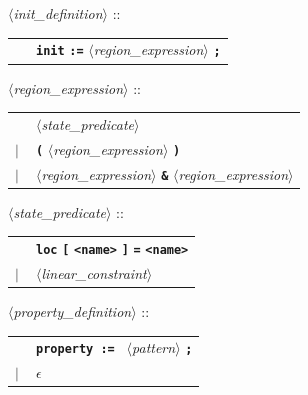 \documentclass[a4paper,11pt]{article}
\newcommand{\emptystring}{$\epsilon$}
\newcommand{\nt}[1]{$\langle$\emph{#1}$\rangle$}
\newcommand{\regleGrammaire}[1]{\bigskip \noindent \nt{#1} :: \\}
\newcommand{\code}[1]{\textbf{\texttt{#1}}}
\begin{document}
\regleGrammaire{init\_definition}
\begin{tabular}{l l}
	\  & \code{init} \code{:=} \nt{region\_expression} \code{;} \\
\end{tabular}

\regleGrammaire{region\_expression}
\begin{tabular}{l l}
	\  & \nt{state\_predicate} \\
	$|$ & \code{(} \nt{region\_expression} \code{)} \\
	$|$ & \nt{region\_expression} \code{\&} \nt{region\_expression} \\
\end{tabular}

\regleGrammaire{state\_predicate}
\begin{tabular}{l l}
	\  & \code{loc} \code{[} \code{<name>} \code{]} \code{=} \code{<name>} \\
	$|$ & \nt{linear\_constraint} \\
\end{tabular}

\regleGrammaire{property\_definition}
\begin{tabular}{l l}
	\  & \code{property := } \nt{pattern} \code{;} \\
	$|$ & \emptystring \\
\end{tabular}
\end{document}
